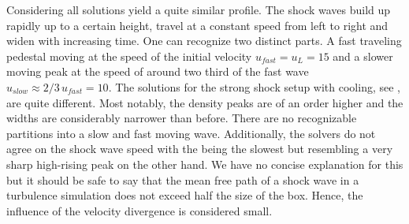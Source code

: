 Considering  all solutions yield a
quite similar profile. The shock waves build up rapidly up to a certain
height, travel at a constant speed from left to right and widen with increasing
time. One can recognize two distinct parts. A fast traveling pedestal moving at
the speed of the initial velocity $u_{fast} = u_L = 15$ and a slower moving
peak at the speed of around two third of the fast wave $u_{slow} \approx
2/3\,u_{fast} = 10$. 
The solutions for the strong shock setup with cooling, see
, are quite different. Most
notably, the density peaks are of an order higher and the widths are
considerably narrower than before. There are no recognizable partitions into a
slow and fast moving wave. Additionally, the solvers do not agree on the shock
wave speed with the \eufv  being the slowest but resembling a very sharp
high-rising peak on the other hand. We have no concise explanation for this but
it should be safe to say that the mean free path of a shock wave in a turbulence
simulation does not exceed half the size of the box. Hence, the influence of
the velocity divergence is considered small.



